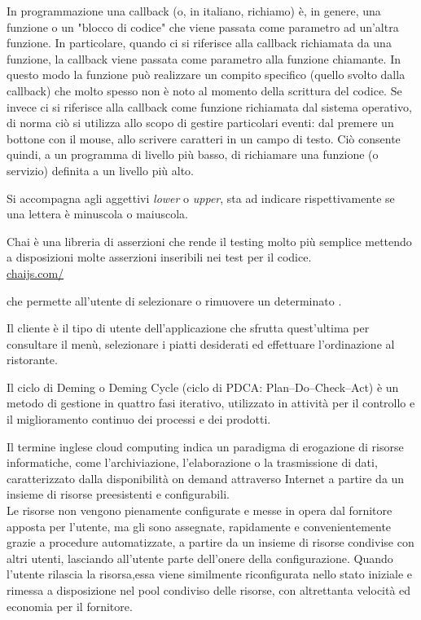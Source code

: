 In programmazione una callback (o, in italiano, richiamo) è, in genere, una funzione o un "blocco di codice" che viene passata come parametro ad un'altra funzione. 
In particolare, quando ci si riferisce alla callback richiamata da una funzione, la callback viene passata come parametro alla funzione chiamante. In questo modo la funzione può realizzare un compito specifico (quello svolto dalla callback) che molto spesso non è noto al momento della scrittura del codice. Se invece ci si riferisce alla callback come funzione richiamata dal sistema operativo, di norma ciò si utilizza allo scopo di gestire particolari eventi: dal premere un bottone con il mouse, allo scrivere caratteri in un campo di testo. Ciò consente quindi, a un programma di livello più basso, di richiamare una funzione (o servizio) definita a un livello più alto.

Si accompagna agli aggettivi \textit{lower} o \textit{upper}, sta ad indicare rispettivamente se una lettera è minuscola o maiuscola.


Chai è una libreria  di asserzioni che rende il testing molto più semplice mettendo a disposizioni molte asserzioni inseribili nei test per il codice.\\
\url{chaijs.com/}

 che permette all’utente di selezionare o rimuovere un determinato .

Il cliente è il tipo di utente dell’applicazione che sfrutta quest’ultima per consultare il menù, selezionare i piatti desiderati ed effettuare l’ordinazione al ristorante.

Il ciclo di Deming o Deming Cycle (ciclo di PDCA: Plan–Do–Check–Act) è un metodo di gestione in quattro fasi iterativo, utilizzato in attività per il controllo e il miglioramento continuo dei processi e dei prodotti.

Il termine inglese cloud computing indica un paradigma di erogazione di risorse informatiche, come l'archiviazione, l'elaborazione o la trasmissione di dati, caratterizzato dalla disponibilità on demand attraverso Internet a partire da un insieme di risorse preesistenti e configurabili.\\
Le risorse non vengono pienamente configurate e messe in opera dal fornitore apposta per l'utente, ma gli sono assegnate, rapidamente e convenientemente grazie a procedure automatizzate, a partire da un insieme di risorse condivise con altri utenti, lasciando all'utente parte dell'onere della configurazione. Quando l'utente rilascia la risorsa,essa viene similmente riconfigurata nello stato iniziale e rimessa a disposizione nel pool condiviso delle risorse, con altrettanta velocità ed economia per il fornitore.

